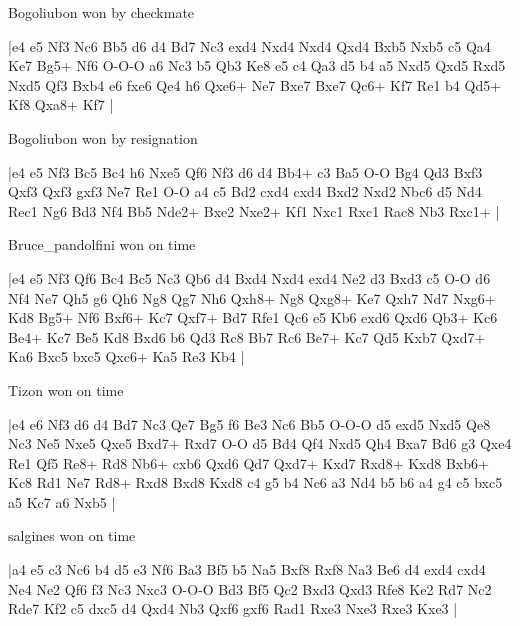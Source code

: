 \showboard

Bogoliubon won by checkmate

\makegametitle
|e4 e5 Nf3 Nc6 Bb5 d6 d4 Bd7 Nc3 exd4 Nxd4 Nxd4 Qxd4 Bxb5 Nxb5 c5 Qa4 Ke7 Bg5+ Nf6 O-O-O a6 Nc3 b5 Qb3 Ke8 e5 c4 Qa3 d5 b4 a5 Nxd5 Qxd5 Rxd5 Nxd5 Qf3 Bxb4 e6 fxe6 Qe4 h6 Qxe6+ Ne7 Bxe7 Bxe7 Qc6+ Kf7 Re1 b4 Qd5+ Kf8 Qxa8+ Kf7  |

\showboard

Bogoliubon won by resignation

\makegametitle
|e4 e5 Nf3 Bc5 Bc4 h6 Nxe5 Qf6 Nf3 d6 d4 Bb4+ c3 Ba5 O-O Bg4 Qd3 Bxf3 Qxf3 Qxf3 gxf3 Ne7 Re1 O-O a4 c5 Bd2 cxd4 cxd4 Bxd2 Nxd2 Nbc6 d5 Nd4 Rec1 Ng6 Bd3 Nf4 Bb5 Nde2+ Bxe2 Nxe2+ Kf1 Nxc1 Rxc1 Rac8 Nb3 Rxc1+  |

\showboard

Bruce\_pandolfini won on time

\makegametitle
|e4 e5 Nf3 Qf6 Bc4 Bc5 Nc3 Qb6 d4 Bxd4 Nxd4 exd4 Ne2 d3 Bxd3 c5 O-O d6 Nf4 Ne7 Qh5 g6 Qh6 Ng8 Qg7 Nh6 Qxh8+ Ng8 Qxg8+ Ke7 Qxh7 Nd7 Nxg6+ Kd8 Bg5+ Nf6 Bxf6+ Kc7 Qxf7+ Bd7 Rfe1 Qc6 e5 Kb6 exd6 Qxd6 Qb3+ Kc6 Be4+ Kc7 Be5 Kd8 Bxd6 b6 Qd3 Rc8 Bb7 Rc6 Be7+ Kc7 Qd5 Kxb7 Qxd7+ Ka6 Bxc5 bxc5 Qxc6+ Ka5 Re3 Kb4  |

\showboard

Tizon won on time

\makegametitle
|e4 e6 Nf3 d6 d4 Bd7 Nc3 Qe7 Bg5 f6 Be3 Nc6 Bb5 O-O-O d5 exd5 Nxd5 Qe8 Nc3 Ne5 Nxe5 Qxe5 Bxd7+ Rxd7 O-O d5 Bd4 Qf4 Nxd5 Qh4 Bxa7 Bd6 g3 Qxe4 Re1 Qf5 Re8+ Rd8 Nb6+ cxb6 Qxd6 Qd7 Qxd7+ Kxd7 Rxd8+ Kxd8 Bxb6+ Kc8 Rd1 Ne7 Rd8+ Rxd8 Bxd8 Kxd8 c4 g5 b4 Nc6 a3 Nd4 b5 b6 a4 g4 c5 bxc5 a5 Kc7 a6 Nxb5  |

\showboard

salgines won on time

\makegametitle
|a4 e5 c3 Nc6 b4 d5 e3 Nf6 Ba3 Bf5 b5 Na5 Bxf8 Rxf8 Na3 Be6 d4 exd4 cxd4 Ne4 Ne2 Qf6 f3 Nc3 Nxc3 O-O-O Bd3 Bf5 Qc2 Bxd3 Qxd3 Rfe8 Ke2 Rd7 Nc2 Rde7 Kf2 c5 dxc5 d4 Qxd4 Nb3 Qxf6 gxf6 Rad1 Rxe3 Nxe3 Rxe3 Kxe3  |

\showboard

